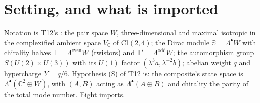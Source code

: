 \documentclass[11pt]{article}
\theoremstyle{definition}
\theoremstyle{plain}
\providecommand{\C}{}\renewcommand{\C}{\mathbb{C}}
\providecommand{\Cl}{}\renewcommand{\Cl}{\mathrm{Cl}}
\providecommand{\Sp}{}\renewcommand{\Sp}{\mathbb{S}}
\providecommand{\T}{}\renewcommand{\T}{\mathbb{T}}
\begin{document}
\noindent{}
\newpage

\section{Setting, and what is imported}

\label{c:note.rungs.setting-setting-what-imported}
Notation is T12's \cite{ButlerT12}: the pair space $W$, three-dimensional and maximal isotropic in the complexified ambient space $V_{\C}$ of $\Cl(2,4)$; the Dirac module $\Sp = \Lambda^{\bullet}W$ with chirality halves $\T = \Lambda^{\mathrm{even}}W$ (twistors) and $\T' = \Lambda^{\mathrm{odd}}W$; the automorphism group $S(U(2) \times U(3))$ with its $U(1)$ factor $(\lambda^{3}a, \lambda^{-2}b)$; abelian weight $q$ and hypercharge $Y = q/6$. Hypothesis (S) of T12 is: the composite's state space is $\Lambda^{\bullet}(\C^{2} \oplus W)$, with $(A, B)$ acting as $\Lambda^{\bullet}(A \oplus B)$ and chirality the parity of the total mode number. Eight imports.
\end{document}
